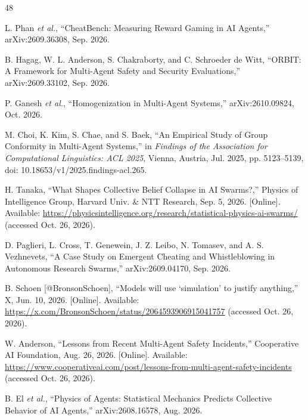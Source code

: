 \renewcommand{\refname}{References}
\begin{thebibliography}{48}
\small

 L. Phan \textit{et al.}, ``CheatBench: Measuring Reward Gaming in AI Agents,''
arXiv:2609.36308, Sep. 2026.

 B. Hagag, W. L. Anderson, S. Chakraborty, and C. Schroeder de Witt, ``ORBIT: A Framework
for Multi-Agent Safety and Security Evaluations,'' arXiv:2609.33102, Sep. 2026.

 P. Ganesh \textit{et al.}, ``Homogenization in Multi-Agent Systems,''
arXiv:2610.09824, Oct. 2026.

 M. Choi, K. Kim, S. Chae, and S. Baek, ``An Empirical Study of Group Conformity in
Multi-Agent Systems,'' in \textit{Findings of the Association for Computational Linguistics: ACL 2025}, Vienna,
Austria, Jul. 2025, pp. 5123--5139, doi: 10.18653/v1/2025.findings-acl.265.

 H. Tanaka, ``What Shapes Collective Belief Collapse in AI Swarms?,'' Physics of
Intelligence Group, Harvard Univ. \& NTT Research, Sep. 5, 2026. [Online]. Available:
\url{https://physicsintelligence.org/research/statistical-physics-ai-swarms/} (accessed Oct. 26, 2026).

 D. Paglieri, L. Cross, T. Genewein, J. Z. Leibo, N. Tomasev, and A. S.
Vezhnevets, ``A Case Study on Emergent Cheating and Whistleblowing in Autonomous Research Swarms,''
arXiv:2609.04170, Sep. 2026.

 B. Schoen [@BronsonSchoen], ``Models will use `simulation' to justify anything,''
X, Jun. 10, 2026. [Online]. Available: \url{https://x.com/BronsonSchoen/status/2064593906915041757} (accessed Oct.
26, 2026).

 W. Anderson, ``Lessons from Recent Multi-Agent Safety Incidents,'' Cooperative AI
Foundation, Aug. 26, 2026. [Online]. Available:
\url{https://www.cooperativeai.com/post/lessons-from-multi-agent-safety-incidents} (accessed Oct. 26, 2026).

 B. El \textit{et al.}, ``Physics of Agents: Statistical Mechanics Predicts Collective
Behavior of AI Agents,'' arXiv:2608.16578, Aug. 2026.


\end{thebibliography}
